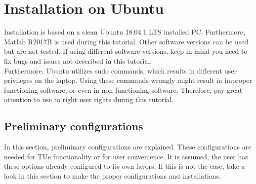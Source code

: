 \chapter{Installation on Ubuntu}
Installation is based on a clean Ubuntu 18.04.1 LTS installed PC. Furthermore, Matlab R2017B is used during this tutorial. Other software versions can be used but are not tested. If using different software versions, keep in mind you need to fix bugs and issues not described in this tutorial.\\
\newline 
Furthermore, Ubuntu utilizes sudo commands, which results in different user privileges on the laptop. Using these commands wrongly might result in improper functioning software, or even in non-functioning software. Therefore, pay great attention to use to right user rights during this tutorial.
\section{Preliminary configurations}
In this section, preliminary configurations are explained. These configurations are needed for TUe functionality or for user convenience. It is assumed, the user has these options already configured to its own favors. If this is not the case, take a look in this section to make the proper configurations and installations.
